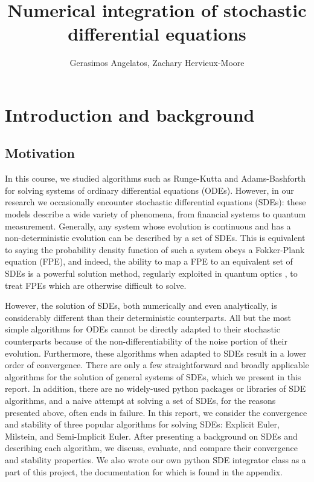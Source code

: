 \documentclass[onecolumn,notitlepage,pra,10pt,aps]{revtex4-1}
\begin{document}
\title{Numerical integration of stochastic differential equations}
\author{Gerasimos Angelatos, Zachary Hervieux-Moore}
\affiliation{}
\maketitle
\tableofcontents
{}

\section{Introduction and background}

\subsection{Motivation}
In this course, we studied algorithms such as Runge-Kutta and Adams-Bashforth for solving systems of ordinary differential equations (ODEs).  However, in our research we occasionally encounter stochastic differential equations (SDEs): these models describe a wide variety of phenomena, from financial systems to quantum measurement.  Generally, any system whose evolution is continuous and has a non-deterministic evolution can be described by a set of SDEs.  This is equivalent to saying the probability density function of such a system obeys a Fokker-Plank equation (FPE), and indeed, the ability to map a FPE to an equivalent set of SDEs is a powerful solution method, regularly exploited in quantum optics \cite{Carmichael1999}, to treat FPEs which are otherwise difficult to solve.  

However, the solution of SDEs, both numerically and even analytically, is considerably different than their deterministic counterparts.  All but the most simple algorithms for ODEs cannot be directly adapted to their stochastic counterparts because of the non-differentiability of the noise portion of their evolution.  Furthermore, these algorithms when adapted to SDEs result in a lower order of convergence.
There are only a few straightforward and broadly applicable algorithms for the solution of general systems of SDEs, which we present in this report. In addition, there are no widely-used python packages or libraries of SDE algorithms, and a naive attempt at solving a set of SDEs, for the reasons presented above, often ends in failure.  In this report, we consider the convergence and stability of three popular algorithms for solving SDEs:  Explicit Euler, Milstein, and Semi-Implicit Euler.  After presenting a background on SDEs and describing each algorithm, we discuss, evaluate, and compare their convergence and stability properties.  We also wrote our own python SDE integrator class as a part of this project, the documentation for which is found in the appendix.
\end{document}
